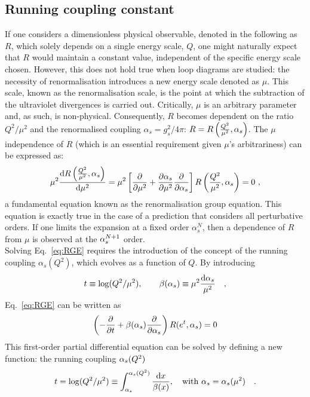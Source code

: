\subsection{Running coupling constant}
If one considers a dimensionless physical observable, denoted in the following as $R$, which solely depends on a single energy scale, $Q$, one might naturally expect that $R$ would maintain a constant value, independent of the specific energy scale chosen. However, this does not hold true when loop diagrams are studied: the necessity of renormalisation introduces a new energy scale denoted as $\mu$. This scale, known as the renormalisation scale, is the point at which the subtraction of the ultraviolet divergences is carried out. Critically, $\mu$ is an arbitrary parameter and, as such, is non-physical. Consequently, $R$ becomes dependent on the ratio $Q^2/\mu^2$ and the renormalised coupling $\alpha_s = g_s^2/4\pi$: $R = R\left(\frac{Q^2}{\mu^2},\alpha_s\right)$. The $\mu$ independence of $R$ (which is an essential requirement given $\mu$'s arbitrariness) can be expressed as:
\begin{equation}\label{eq:RGE}
    \mu^2 \frac{\mathrm{d} R\left(\frac{Q^2}{\mu^2},\alpha_s\right)}{\mathrm{d} \mu^2} = \mu^2 \left[\frac{\partial}{\partial\mu^2}+\frac{\partial \alpha_s}{\partial\mu^2}\frac{\partial}{\partial\alpha_s}\right]R\left(\frac{Q^2}{\mu^2},\alpha_s\right) = 0\ , 
\end{equation}
a fundamental equation known as the renormalisation group equation. This equation is exactly true in the case of a prediction that considers all perturbative orders. If one limits the expansion at a fixed order $\alpha_s^N$, then a dependence of $R$ from $\mu$ is observed at the $\alpha_s^{N+1}$ order.\\ Solving Eq.~\ref{eq:RGE} requires the introduction of the concept of the running coupling $\alpha_s(Q^2)$, which evolves as a function of $Q$. By introducing
\begin{equation*}
    t\equiv \mathrm{log}(Q^2/\mu^2), \qquad \beta(\alpha_s)\equiv \mu^2 \frac{\mathrm{d}\alpha_s}{\mathrm{\mu^2}}\quad ,
\end{equation*}
Eq.~\ref{eq:RGE} can be written as
\begin{equation*}
    \left(-\frac{\partial}{\partial t} + \beta(\alpha_s)\frac{\partial}{\partial \alpha_s}\right) R(e^t,\alpha_s) = 0
\end{equation*}
This first-order partial differential equation can be solved by defining a new function: the running coupling $\alpha_s(Q^2)$
\begin{equation}\label{eq:t_integral}
    t = \mathrm{log}(Q^2/\mu^2) \equiv \int_{\alpha_s}^{\alpha_s(Q^2)} \frac{\mathrm{d} x}{\beta(x)} , \quad \mathrm{with}~\alpha_s=\alpha_s(\mu^2)\quad .
\end{equation}
